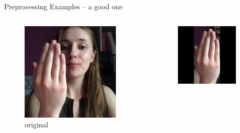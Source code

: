 \documentclass[aspectratio=169]{beamer}
\begin{document}
{	
	\begin{frame}{Preprocessing Examples -- a good one}
\begin{columns}[c]
    \begin{column}{.33\textwidth}
    \begin{figure}
        \centering
        \includegraphics[width=0.9\textwidth]{img/test/nasmi_203.png}
        \caption{original}
    \end{figure}      
    \end{column}
    \begin{column}{.33\textwidth}
    \begin{figure}
        \centering
        \includegraphics[width=0.9\textwidth]{img/cropped/nasmi_203.png}

\end{figure}
\end{column}
\end{columns}
\end{frame}}
\end{document}

